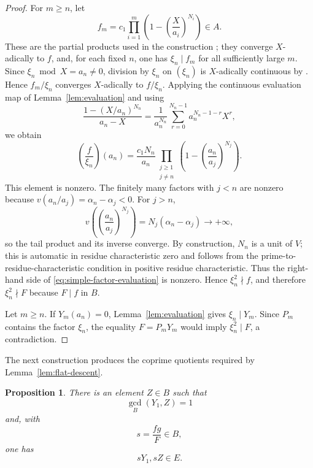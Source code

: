 \documentclass[12pt]{amsart}
\newtheorem{proposition}[theorem]{Proposition}
\theoremstyle{plain}
\begin{document}
\begin{proof}
For $m\geq n$, let
\[
  f_m=c_1\prod_{i=1}^m
  \left(1-\left(\frac{X}{a_i}\right)^{N_i}\right)\in A.
\]
These are the partial products used in the construction
\cite[Proposition~5.2]{Wang}; they converge $X$-adically to $f$, and,
for each fixed $n$, one has $\xi_n\mid f_m$ for all sufficiently large $m$.
Since $\xi_n\bmod X=a_n\neq0$, division by $\xi_n$ on $(\xi_n)$ is
$X$-adically continuous by \cite[Lemma~2.3(i)]{Wang}.  Hence
$f_m/\xi_n$ converges $X$-adically to $f/\xi_n$.  Applying the
continuous evaluation map of Lemma~\ref{lem:evaluation} and using
\[
  \frac{1-(X/a_n)^{N_n}}{a_n-X}
  =\frac1{a_n^{N_n}}
    \sum_{r=0}^{N_n-1}a_n^{N_n-1-r}X^r,
\]
we obtain
\begin{equation}\label{eq:simple-factor-evaluation}
  \left(\frac{f}{\xi_n}\right)(a_n)
  =\frac{c_1N_n}{a_n}
   \prod_{\substack{j\geq1\\ j\neq n}}
   \left(1-\left(\frac{a_n}{a_j}\right)^{N_j}\right).
\end{equation}
This element is nonzero.  The finitely many factors with $j<n$ are
nonzero because
$v(a_n/a_j)=\alpha_n-\alpha_j<0$.  For $j>n$,
\[
  v\!\left(\left(\frac{a_n}{a_j}\right)^{N_j}\right)
  =N_j(\alpha_n-\alpha_j)\longrightarrow+\infty,
\]
so the tail product and its inverse converge.  By construction,
$N_n$ is a unit of $V$; this is automatic in residue characteristic
zero and follows from the prime-to-residue-characteristic condition in
positive residue characteristic.  Thus the right-hand side of
\eqref{eq:simple-factor-evaluation} is nonzero.  Hence
$\xi_n^2\nmid f$, and therefore $\xi_n^2\nmid F$ because $F\mid f$ in
$B$.

Let $m\geq n$.  If $Y_m(a_n)=0$, Lemma~\ref{lem:evaluation} gives
$\xi_n\mid Y_m$.  Since $P_m$ contains the factor $\xi_n$, the equality
$F=P_mY_m$ would imply $\xi_n^2\mid F$, a contradiction.
\end{proof}

The next construction produces the coprime quotients required by
Lemma~\ref{lem:flat-descent}.

\begin{proposition}\label{prop:coprime-tail}
There is an element $Z\in B$ such that
\begin{equation}\label{eq:coprime-tail}
  \gcd_B(Y_1,Z)=1
\end{equation}
and, with
\[
  s=\frac{fg}{F}\in B,
\]
one has
\begin{equation}\label{eq:tail-elements-in-E}
  sY_1,sZ\in E.
\end{equation}
\end{proposition}
\end{document}

